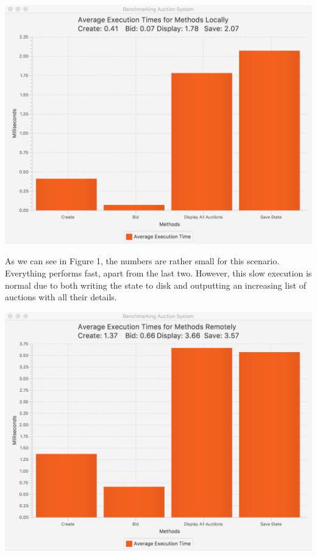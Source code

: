 \documentclass[11pt]{article}
\begin{document}
	\begin{center}
		\includegraphics[scale=0.4]{local_performance.png}
	\end{center}

	\vspace{0.25cm}
	
	As we can see in Figure 1, the numbers are rather small for this scenario. Everything performs fast, apart from the last two. However, this slow execution is normal due to both writing the state to disk and outputting an increasing list of auctions with all their details.
	
	\vspace{0.25cm}
	
	\begin{center}
		\includegraphics[scale=0.4]{remote_performance.png}
	\end{center}
	
\end{document}
